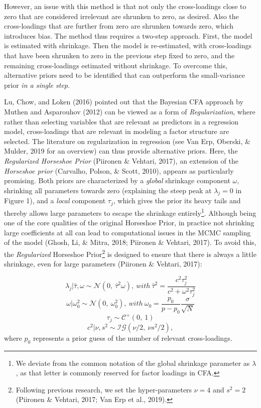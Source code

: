 \documentclass[
  english,
  man]{apa6}
\begin{document}
However, an issue with this method is that not only the cross-loadings
close to zero that are considered irrelevant are shrunken to zero, as
desired. Also the cross-loadings that are further from zero are shrunken
towards zero, which introduces bias. The method thus requires a two-step
approach. First, the model is estimated with shrinkage. Then the model
is re-estimated, with cross-loadings that have been shrunken to zero in
the previous step fixed to zero, and the remaining cross-loadings
estimated without shrinkage. To overcome this, alternative priors need
to be identified that can outperform the small-variance prior \emph{in a
single step}.

Lu, Chow, and Loken (2016) pointed out that the Bayesian CFA approach by
Muthen and Asparouhov (2012) can be viewed as a form of \emph{Regularization}, where
rather than selecting variables that are relevant as predictors in a
regression model, cross-loadings that are relevant in modeling a factor
structure are selected. The literature on regularization in regression
(see Van Erp, Oberski, \& Mulder, 2019 for an overview) can thus provide
alternative priors. Here, the \emph{Regularized Horseshoe Prior}
(Piironen \& Vehtari, 2017), an extension of the \emph{Horseshoe prior}
(Carvalho, Polson, \& Scott, 2010), appears as particularly promising. Both
priors are characterized by a \emph{global} shrinkage component \(\omega\),
shrinking all parameters towards zero (explaining the steep peak at
\(\lambda_j = 0\) in Figure 1), and a \emph{local} component \(\tau_j\), which
gives the prior its heavy tails and thereby allows large parameters to
escape the shrinkage entirely\footnote{We deviate from the common notation of the global shrinkage
  parameter as \(\lambda\), as that letter is commonly reserved for
  factor loadings in CFA.}. Although being one of the core
qualities of the original Horseshoe Prior, in practice not shrinking
large coefficients at all can lead to computational issues in the MCMC
sampling of the model (Ghosh, Li, \& Mitra, 2018; Piironen \& Vehtari, 2017). To
avoid this, the \emph{Regularized} Horseshoe Prior\footnote{Following previous research, we set the hyper-parameters \(\nu = 4\)
  and \(s^2 = 2\) (Piironen \& Vehtari, 2017; Van Erp et al., 2019).} is designed to ensure
that there is always a little shrinkage, even for large parameters
(Piironen \& Vehtari, 2017):

\[\lambda_j | \hat{\tau}, \omega \sim \mathcal{N}(0, \ \hat{\tau}^2 \omega), \ with \ \hat{\tau}^2 = \frac{c^2\tau_j^2}{c^2 + \omega^2 \tau_j^2}\]
\[\omega | \omega_0^2 \sim \mathcal{N}(0,\  \omega_0^2), \ with \  \omega_0 = \frac{p_0}{p-p_0}\frac{\sigma}{\sqrt{N}}\]
\[\tau_j \sim \mathcal{C^+}(0, \ 1)\]
\[c^2 | \nu, s^2 \sim \mathcal{IG}(\nu/2, \  \nu s^2/2),\] where \(p_0\)
represents a prior guess of the number of relevant cross-loadings.
\end{document}
